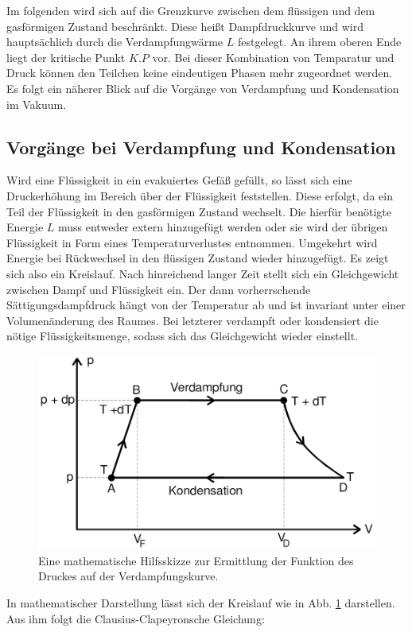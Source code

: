      Im folgenden wird sich auf die Grenzkurve zwischen dem flüssigen und dem
      gasförmigen Zustand beschränkt. Diese heißt Dampfdruckkurve und wird hauptsächlich durch die
      Verdampfungwärme $L$ festgelegt. An ihrem oberen Ende liegt der kritische Punkt
       $K.P$ vor. Bei dieser Kombination von Temparatur und Druck können den
       Teilchen keine eindeutigen Phasen mehr zugeordnet werden. Es folgt ein näherer Blick auf die Vorgänge von
      Verdampfung und Kondensation im Vakuum.
\subsection{Vorgänge bei Verdampfung und Kondensation}
Wird eine Flüssigkeit in ein evakuiertes Gefäß gefüllt, so lässt sich eine
 Druckerhöhung im Bereich über der Flüssigkeit feststellen. Diese erfolgt, da ein Teil der
  Flüssigkeit in den gasförmigen Zustand wechselt. Die hierfür benötigte
   Energie $L$ muss entweder extern hinzugefügt werden oder sie wird der übrigen
    Flüssigkeit in Form eines Temperaturverlustes entnommen. Umgekehrt wird
     Energie bei Rückwechsel in den flüssigen Zustand wieder hinzugefügt. Es
      zeigt sich also ein Kreislauf. Nach hinreichend langer Zeit stellt sich
       ein Gleichgewicht zwischen Dampf und Flüssigkeit ein. Der dann vorherrschende
        Sättigungsdampfdruck hängt von der Temperatur ab und ist invariant
         unter einer Volumenänderung des Raumes. Bei letzterer
         verdampft oder kondensiert die nötige Flüssigkeitsmenge, sodass sich das Gleichgewicht wieder einstellt.
         \begin{figure}
         	\centering
         	\includegraphics[width=\linewidth-150pt,height=\textheight-150pt,keepaspectratio]{content/Bilder/Kreislauf.png}
         	\caption{Eine mathematische Hilfsskizze zur Ermittlung der Funktion des Druckes auf der Verdampfungskurve\cite{V203}.}
         	\label{fig:Kreislauf}
         \end{figure}
         In mathematischer Darstellung lässt sich der Kreislauf wie in Abb.
         \ref{fig:Kreislauf} darstellen. Aus ihm folgt die Clausius-Clapeyronsche Gleichung:

